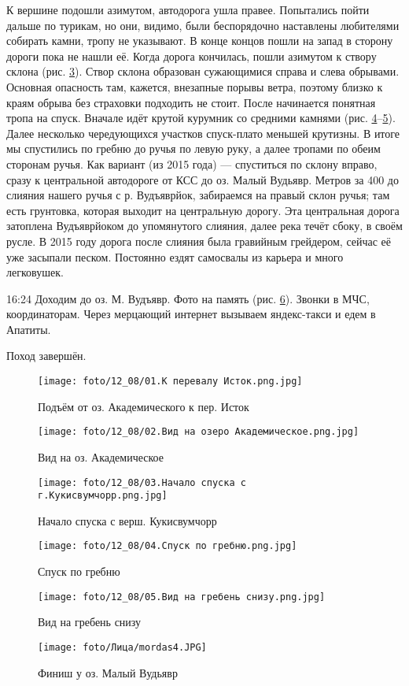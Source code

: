 К вершине подошли азимутом, автодорога ушла правее. Попытались пойти дальше по турикам, но они, видимо,
были беспорядочно наставлены любителями собирать камни, тропу не указывают. В конце концов пошли на запад
в сторону дороги пока не нашли её. Когда дорога кончилась, пошли азимутом к створу склона (рис. \ref{fig8:3}).
Створ склона образован сужающимися справа и слева обрывами. Основная опасность там, кажется, внезапные порывы ветра,
поэтому близко к краям обрыва без страховки подходить не стоит. После начинается понятная тропа на спуск.
Вначале идёт крутой курумник со средними камнями (рис. \ref{fig8:4}--\ref{fig8:5}).
Далее несколько чередующихся участков спуск-плато меньшей крутизны.
В итоге мы спустились по гребню до ручья по левую руку, а далее тропами по обеим сторонам ручья.
Как вариант (из 2015 года) --- спуститься по склону вправо, сразу к центральной автодороге от КСС до оз. Малый Вудьявр.
Метров за 400 до слияния нашего ручья с р. Вудъяврйок, забираемся на правый склон ручья;
там есть грунтовка, которая выходит на центральную дорогу. Эта центральная дорога затоплена Вудъяврйоком до упомянутого слияния,
далее река течёт сбоку, в своём русле. В 2015 году дорога после слияния была гравийным грейдером,
сейчас её уже засыпали песком. Постоянно ездят самосвалы из карьера и много легковушек.

16:24 Доходим до оз. М. Вудъявр. Фото на память (рис. \ref{fig8:6}). Звонки в МЧС, координаторам.
Через мерцающий интернет вызываем яндекс-такси и едем в Апатиты.

Поход завершён.

\begin{figure}
    \centering
    \texttt{[image: foto/12\_08/01.К перевалу Исток.png.jpg]}
    \caption{Подъём от оз. Академического к пер. Исток}
    \label{fig8:1}
\end{figure}

\begin{figure}
    \centering
    \texttt{[image: foto/12\_08/02.Вид на озеро Академическое.png.jpg]}
    \caption{Вид на оз. Академическое}
    \label{fig8:2}
\end{figure}

\begin{figure}
    \centering
    \texttt{[image: foto/12\_08/03.Начало спуска с г.Кукисвумчорр.png.jpg]}
    \caption{Начало спуска с верш. Кукисвумчорр}
    \label{fig8:3}
\end{figure}

\begin{figure}
    \centering
    \texttt{[image: foto/12\_08/04.Спуск по гребню.png.jpg]}
    \caption{Спуск по гребню}
    \label{fig8:4}
\end{figure}

\begin{figure}
    \centering
    \texttt{[image: foto/12\_08/05.Вид на гребень снизу.png.jpg]}
    \caption{Вид на гребень снизу}
    \label{fig8:5}
\end{figure}

\begin{figure}
    \centering
    \texttt{[image: foto/Лица/mordas4.JPG]}
    \caption{Финиш у оз. Малый Вудьявр}
    \label{fig8:6}
\end{figure}
